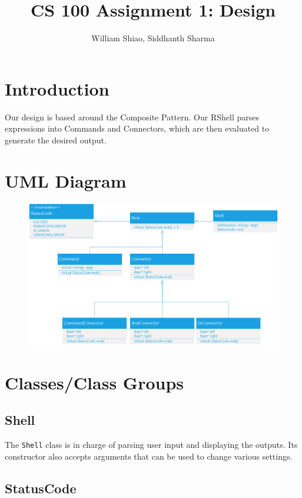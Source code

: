 \documentclass{article}
\title{CS 100 Assignment 1: Design}
\author{William Shiao, Siddhanth Sharma}
\begin{document}
\maketitle

\section{Introduction}

Our design is based around the Composite Pattern. Our RShell parses expressions into Commands and Connectors, which are then evaluated to generate the desired output.

\section{UML Diagram}

\begin{figure}[H]
\centering
\includegraphics[width=1\textwidth]{uml.png}
\end{figure}

\section{Classes/Class Groups}

\subsection{Shell}

The \texttt{Shell} class is in charge of parsing user input and displaying the outputs. Its constructor also accepts arguments that can be used to change various settings.	

\subsection{StatusCode}
\end{document}
